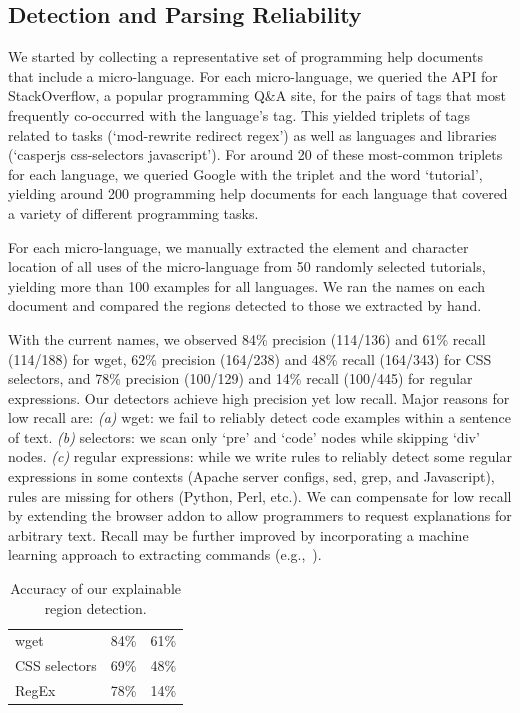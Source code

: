 \begin{changes}
\subsection{Detection and Parsing Reliability}

We started by collecting a representative set of programming help documents that include a micro-language.
For each micro-language, we queried the API for StackOverflow, a popular programming Q\&A site, for the pairs of tags that most frequently co-occurred with the language's tag.
This yielded triplets of tags related to  tasks (`mod-rewrite redirect regex') as well as  languages and libraries (`casperjs css-selectors javascript').
For around 20 of these most-common triplets for each language, we queried Google with the triplet and the word `tutorial', yielding around 200 programming help documents for each language that covered a variety of different programming tasks.

For each micro-language, we manually extracted the element and character location of all uses of the micro-language from 50 randomly selected tutorials, yielding more than 100 examples for all languages.  We ran the \glspl{name} on each document and compared the regions detected to those we extracted by hand. 

With the current \glspl{name}, we observed 84\% precision (114/136) and 61\% recall (114/188) for wget, 62\% precision (164/238) and 48\% recall (164/343) for CSS selectors, and 78\% precision (100/129) and 14\% recall (100/445) for regular expressions.
Our detectors achieve high precision yet low recall.
Major reasons for low recall are:
\emph{(a)} wget: we fail to reliably detect code examples within a sentence of text.
\emph{(b)} selectors: we scan only `pre' and `code' nodes while skipping `div' nodes.
\emph{(c)} regular expressions: while we write rules to reliably detect some regular expressions in some contexts (Apache server configs, sed, grep, and Javascript), rules are missing for others (Python, Perl, etc.).
We can compensate for low recall by extending the browser addon to allow programmers to request explanations for arbitrary text.
Recall may be further improved by incorporating a machine learning approach to extracting commands (e.g.,~\cite{pavel_browsing_2013}).

\begin{table}
\caption{Accuracy of our explainable region detection.}
\label{tab:detection_accuracy}
\centering
\begin{tabular}{llc}
\toprule
\headrow{Language} & \headrow{Precision} & \headrow{Recall} \\
\midrule
wget & 84\% & 61\% \\ \midrule
CSS selectors & 69\% & 48\% \\ \midrule
RegEx & 78\% & 14\% \\ \bottomrule
\end{tabular}
\end{table}
\fi


\end{changes}

